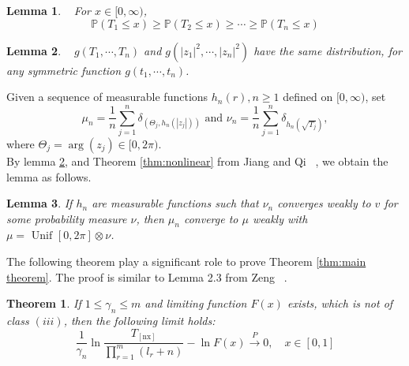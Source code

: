 \documentclass[12pt]{article}
\theoremstyle{plain}
\newtheorem{thm}{\textbf{Theorem}}
\newtheorem{lem}{\textbf{Lemma}}
\theoremstyle{definition}
\theoremstyle{remark}
\begin{document}
\begin{lem}\label{lem: Zeng 2017   lem 2.3}~\cite{zeng2017}
For $x \in[0, \infty)$,
\begin{equation*}
\mathbb{P}\left(T_{1} \leq x\right) \geq \mathbb{P}\left(T_{2} \leq x\right) \geq \cdots   \geq \mathbb{P}\left(T_{n} \leq x\right)
\end{equation*}
\end{lem}
\begin{lem}\label{lem: Zeng2017 Lemma 2.2}~\cite{zeng2017}
$g\left(T_{1}, \cdots, T_{n}\right)$ and $g\left(\left|z_{1}\right|^{2}, \cdots,\left|z_{n}\right|^{2}\right)$ have the same distribution, for any symmetric function $g(t_1,\cdots,t_n)$.
\end{lem}

Given a sequence of measurable functions $h_{n}(r), n\geq 1$ defined on $[0, \infty)$, set
\begin{equation*}
\mu_{n}=\frac{1}{n} \sum_{j=1}^{n} \delta_{\left(\Theta_{j}, h_{n}\left(\left|z_{j}\right|\right)\right)} \text { and } \nu_{n}=\frac{1}{n} \sum_{j=1}^{n} \delta_{h_{n}\left(\sqrt{T_{j}}\right)},
\end{equation*}
where $\Theta_{j}=\arg \left(z_{j}\right) \in[0,2 \pi)$.\\


By lemma  \ref{lem: Zeng2017 Lemma 2.2}, and Theorem
\ref{thm:nonlinear} from Jiang and Qi ~\cite{JiangQi2019}, we obtain
the lemma as follows.
\begin{lem}\label{lem: Zeng 2017   lem ?}
If {$h_n$} are measurable functions such that  $\nu_{n}$ converges weakly to $v$ for some probability measure $\nu$, then $\mu_{n}$ converge to $\mu$ weakly with $\mu=\text { Unif }[0,2 \pi] \otimes \nu$.
\end{lem}

The following theorem play a significant role to prove Theorem
\ref{thm:main theorem}. The proof is similar to Lemma 2.3 from Zeng
~\cite{zeng2017}.

\begin{thm}\label{thm: ln F(x) limit}
    If $1\leq\gamma_{n}\leq m$ and limiting function $F(x)$ exists, which is not of class $(iii)$, then the following limit holds:
    \begin{equation}
    \frac{1}{\gamma_{n}} \ln \frac{T_{[\mathrm{nx}]}}{\prod_{r=1}^{m}(l_r+n)}-\ln F(x) \stackrel{P}{\rightarrow} 0, \quad x \in[0,1]
    \end{equation}
\end{thm}
\end{document}
